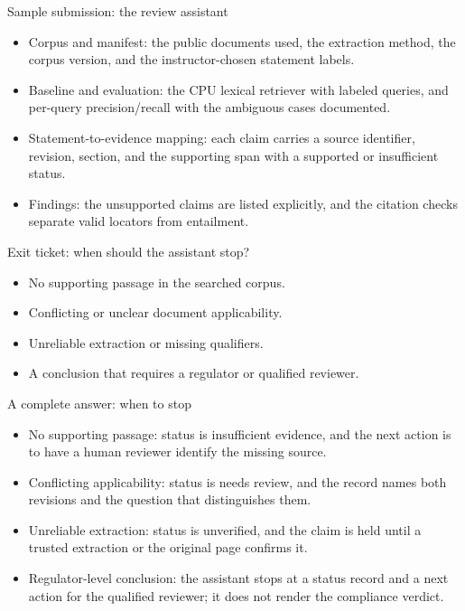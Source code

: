 \documentclass[aspectratio=169,11pt]{beamer}
\begin{document}
\begin{frame}[t,fragile]{Sample submission: the review assistant}
\fontsize{11.5}{14}\selectfont
\begin{itemize}\setlength{\itemsep}{2mm}
\item Corpus and manifest: the public documents used, the extraction method, the corpus version, and the instructor-chosen statement labels.
\item Baseline and evaluation: the CPU lexical retriever with labeled queries, and per-query precision/recall with the ambiguous cases documented.
\item Statement-to-evidence mapping: each claim carries a source identifier, revision, section, and the supporting span with a supported or insufficient status.
\item Findings: the unsupported claims are listed explicitly, and the citation checks separate valid locators from entailment.
\end{itemize}
\end{frame}
\begin{frame}[t,fragile]{Exit ticket: when should the assistant stop?}
\fontsize{11.5}{14}\selectfont
\begin{itemize}\setlength{\itemsep}{2mm}
\item No supporting passage in the searched corpus.
\item Conflicting or unclear document applicability.
\item Unreliable extraction or missing qualifiers.
\item A conclusion that requires a regulator or qualified reviewer.
\end{itemize}
\end{frame}
\begin{frame}[t,fragile]{A complete answer: when to stop}
\fontsize{11.5}{14}\selectfont
\begin{itemize}\setlength{\itemsep}{2mm}
\item No supporting passage: status is insufficient evidence, and the next action is to have a human reviewer identify the missing source.
\item Conflicting applicability: status is needs review, and the record names both revisions and the question that distinguishes them.
\item Unreliable extraction: status is unverified, and the claim is held until a trusted extraction or the original page confirms it.
\item Regulator-level conclusion: the assistant stops at a status record and a next action for the qualified reviewer; it does not render the compliance verdict.
\end{itemize}
\end{frame}
\end{document}

